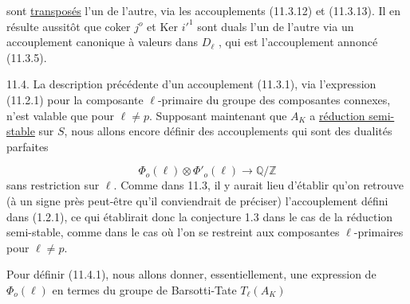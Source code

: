 \begin{center}
\end{center}
sont \underline{transposés} l'un de l'autre, via les accouplements (11.3.12) et (11.3.13). Il en résulte aussitôt que coker $j^o$ et Ker ${i'}^{1}$ sont duals l'un de l'autre via un accouplement canonique à valeurs dans $D_\ell$ , qui est l'accouplement annoncé (11.3.5).

11.4.  La description précédente d'un accouplement (11.3.1), via l'expression (11.2.1) pour la composante $\ell$-primaire du groupe des composantes connexes, n'est valable que pour $\ell \neq p$. Supposant maintenant que $A_K$ a \underline{réduction semi-stable} sur $S$, nous allons encore définir des accouplements qui sont des dualités parfaites

\begin{equation}\tag{11.4.1}
\Phi_o(\ell) \otimes \Phi'_o(\ell) \longrightarrow \mathbb{Q}/\mathbb{Z}
\end{equation}
sans restriction sur $\ell$. Comme dans 11.3, il y aurait lieu d'établir qu'on retrouve (à un signe près peut-être qu'il conviendrait de préciser) l'accouplement défini dans (1.2.1), ce qui établirait donc la conjecture 1.3 dans le cas de la réduction semi-stable, comme dans le cas où l'on se restreint aux composantes $\ell$-primaires pour $\ell \neq p$.

Pour définir (11.4.1), nous allons donner, essentiellement, une expression de $\Phi_o(\ell)$ en termes du groupe de Barsotti-Tate $T_\ell(A_K)$



